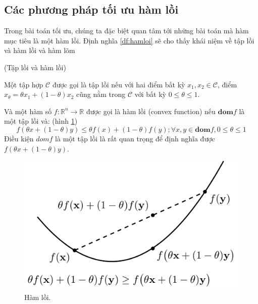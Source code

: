 \subsection{Các phương pháp tối ưu hàm lồi}\label{muc:toiuuhamloi}
Trong bài toán tối ưu, chúng ta đặc biệt quan tâm tới những bài toán mà hàm mục tiêu là một hàm lồi. Định nghĩa \ref{df:hamloi} sẽ cho thấy khái niệm về tập lồi và hàm lồi và hàm lõm \cite{boyd2004convex}
\begin{definition}(Tập lồi và hàm lồi)\label{df:hamloi}
	
	Một tập hợp $\mathcal{C}$ được gọi là tập lồi nếu với hai điểm bất kỳ $x_1,x_2 \in \mathcal{C}$, điểm $x_\theta = \theta x_1 + (1- \theta)x_2$ cũng nằm trong $\mathcal{C}$ với bất kỳ $0 \leq \theta \leq 1$.
	
	Và một hàm số $f: \mathbb{R}^n \rightarrow \mathbb{R}$ được gọi là hàm lồi (convex function) nếu $\textbf{dom}f$  là một tập lồi và: (hình \ref{fig:hamloi})
	\begin{equation}
	f(\theta x + (1-\theta)y) \leq \theta f(x) + (1-\theta)f(y); \forall x,y \in \textbf{dom}f, 0 \leq \theta \leq 1
	\end{equation}
	Điều kiện $domf$ là một tập lồi là rất quan trọng để định nghĩa được $f(\theta x + (1-\theta)y)$.
\end{definition}
\begin{figure}[H]
	\centering
	\includegraphics[width=0.6\linewidth]{Chapter2/Chapter2Figs/convexf_def}
	\caption{Hàm lồi.}
	\label{fig:hamloi}
\end{figure}

